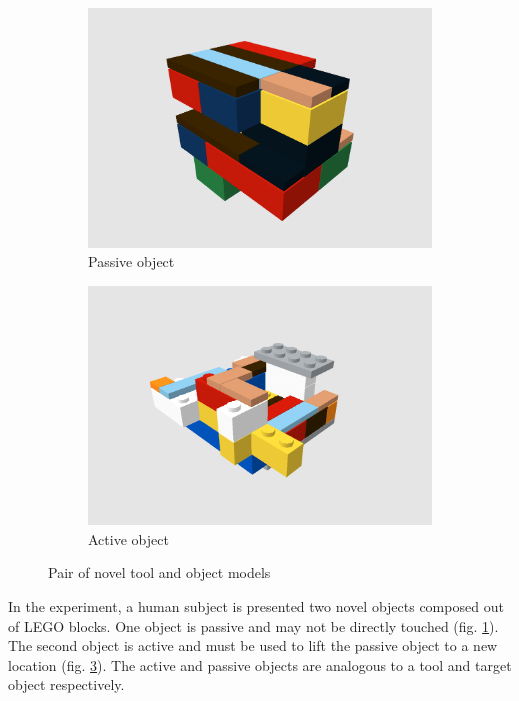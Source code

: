\documentclass[11]{article}
\begin{document}
\begin{figure}[!h]
  \centering
  \begin{subfigure}{0.49\textwidth}
    \includegraphics[width=1\linewidth]{./figures/obj51.png}
    \caption{Passive object}
    \label{fig:obj51}
  \end{subfigure}
  \begin{subfigure}{0.49\textwidth}
    \includegraphics[width=1\linewidth]{./figures/obj52.png}
    \caption{Active object}
    \label{fig:obj52}
  \end{subfigure}
  \caption{Pair of novel tool and object models}
\end{figure}

In the experiment, a human subject is presented two novel objects composed out of LEGO blocks.
One object is passive and may not be directly touched (fig. \ref{fig:obj51}).
The second object is active and must be used to lift the passive object to a new location (fig. \ref{fig:obj52}).
The active and passive objects are analogous to a tool and target object respectively.
\end{document}
